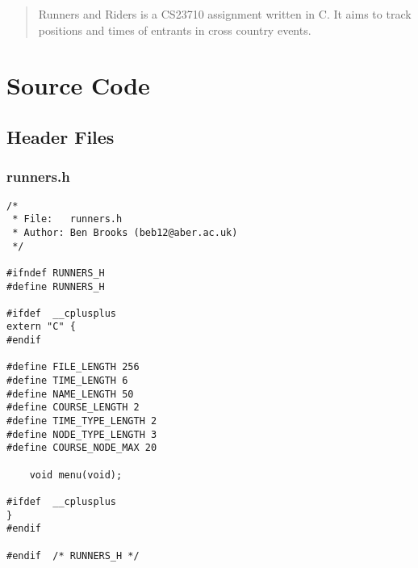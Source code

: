 \documentclass[pdftex,12pt,a4paper]{article}
\begin{document}
\maketitle
\tableofcontents
\newpage

\begin{abstract}
Runners and Riders is a CS23710 assignment written in C. It aims to track positions and times of entrants in cross country events.
\end{abstract}

\section{Source Code}
\subsection{Header Files}
\subsubsection{runners.h}
\begin{verbatim}
/*
 * File:   runners.h
 * Author: Ben Brooks (beb12@aber.ac.uk)
 */

#ifndef RUNNERS_H
#define	RUNNERS_H

#ifdef	__cplusplus
extern "C" {
#endif

#define FILE_LENGTH 256
#define TIME_LENGTH 6
#define NAME_LENGTH 50
#define COURSE_LENGTH 2
#define TIME_TYPE_LENGTH 2
#define NODE_TYPE_LENGTH 3
#define COURSE_NODE_MAX 20

    void menu(void);

#ifdef	__cplusplus
}
#endif

#endif	/* RUNNERS_H */
\end{verbatim}
\end{document}
